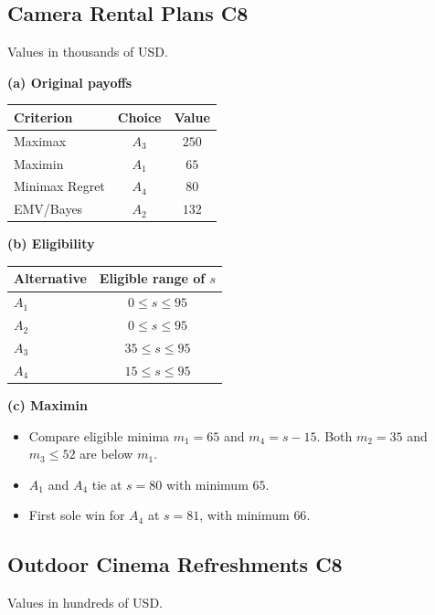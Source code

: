 {\small
\subsection{Camera Rental Plans \hfill C8}
\noindent Values in thousands of USD.

\noindent\begin{minipage}[t]{0.35\textwidth}
  \vspace{0pt}
  \textbf{(a) Original payoffs}\par\smallskip
  \setlength{\tabcolsep}{3pt}
  \begin{tabular}{@{}lcc@{}}
    \toprule
    Criterion & Choice & Value\\ \midrule
    Maximax & $A_3$ & $250$\\
    Maximin & $A_1$ & $65$\\
    Minimax Regret & $A_4$ & $80$\\
    EMV/Bayes & $A_2$ & $132$\\
    \bottomrule
  \end{tabular}
\end{minipage}\hfill
\begin{minipage}[t]{0.62\textwidth}
  \vspace{0pt}
  \textbf{(b) Eligibility}\par\smallskip
  \begin{tabular}{@{}lc@{}}
    \toprule
    Alternative & Eligible range of $s$\\ \midrule
    $A_1$ & $0\le s\le95$\\
    $A_2$ & $0\le s\le95$\\
    $A_3$ & $35\le s\le95$\\
    $A_4$ & $15\le s\le95$\\
    \bottomrule
  \end{tabular}\par\smallskip
  \textbf{(c) Maximin}
  \begin{itemize}[leftmargin=*,nosep]
    \item Compare eligible minima $m_1=65$ and $m_4=s-15$. Both $m_2=35$ and $m_3\le52$ are below $m_1$.
    \item $A_1$ and $A_4$ tie at $s=80$ with minimum $65$.
    \item First sole win for $A_4$ at $\boxed{s=81}$, with minimum $66$.
  \end{itemize}
\end{minipage}

\subsection{Outdoor Cinema Refreshments \hfill C8}
\noindent Values in hundreds of USD.

}
